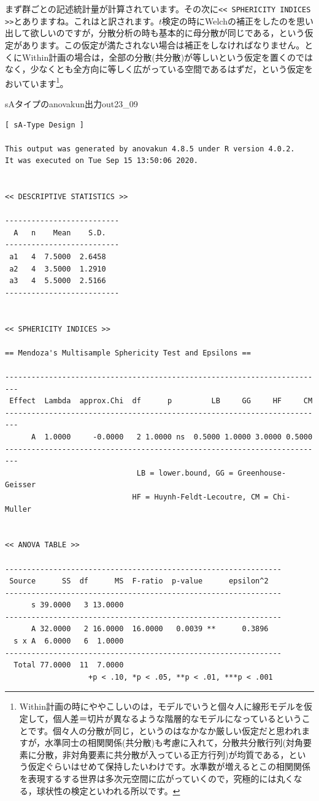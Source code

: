 \documentclass{ltjbook}
\begin{document}
まず群ごとの記述統計量が計算されています。その次に\verb|<< SPHERICITY INDICES >>|とありますね。これはと訳されます。$t$検定の時にWelchの補正をしたのを思い出して欲しいのですが，分散分析の時も基本的に母分散が同じである，という仮定があります。この仮定が満たされない場合は補正をしなければなりません。とくにWithin計画の場合は，全部の分散(共分散)が等しいという仮定を置くのではなく，少なくとも全方向に等しく広がっている空間であるはずだ，という仮定をおいています\footnote{Within計画の時にややこしいのは，モデルでいうと個々人に線形モデルを仮定して，個人差＝切片が異なるような階層的なモデルになっているということです。個々人の分散が同じ，というのはなかなか厳しい仮定だと思われますが，水準同士の相関関係(共分散)も考慮に入れて，分散共分散行列(対角要素に分散，非対角要素に共分散が入っている正方行列)が均質である，という仮定ぐらいはせめて保持したいわけです。水準数が増えるとこの相関関係を表現するする世界は多次元空間に広がっていくので，究極的には丸くなる，球状性の検定といわれる所以です。 }。
\begin{Rscreen}{sAタイプのanovakun出力}{out23_09}
	\begin{verbatim}
[ sA-Type Design ]

This output was generated by anovakun 4.8.5 under R version 4.0.2.
It was executed on Tue Sep 15 13:50:06 2020.

 
<< DESCRIPTIVE STATISTICS >>

--------------------------
  A   n    Mean    S.D. 
--------------------------
 a1   4  7.5000  2.6458 
 a2   4  3.5000  1.2910 
 a3   4  5.5000  2.5166 
--------------------------


<< SPHERICITY INDICES >>

== Mendoza's Multisample Sphericity Test and Epsilons ==

-------------------------------------------------------------------------
 Effect  Lambda  approx.Chi  df      p         LB     GG     HF     CM 
-------------------------------------------------------------------------
      A  1.0000     -0.0000   2 1.0000 ns  0.5000 1.0000 3.0000 0.5000 
-------------------------------------------------------------------------
                              LB = lower.bound, GG = Greenhouse-Geisser
                             HF = Huynh-Feldt-Lecoutre, CM = Chi-Muller


<< ANOVA TABLE >>

---------------------------------------------------------------
 Source      SS  df      MS  F-ratio  p-value      epsilon^2 
---------------------------------------------------------------
      s 39.0000   3 13.0000                                  
---------------------------------------------------------------
      A 32.0000   2 16.0000  16.0000   0.0039 **      0.3896 
  s x A  6.0000   6  1.0000                                  
---------------------------------------------------------------
  Total 77.0000  11  7.0000                                  
                   +p < .10, *p < .05, **p < .01, ***p < .001
\end{verbatim}
\end{Rscreen}
\end{document}
